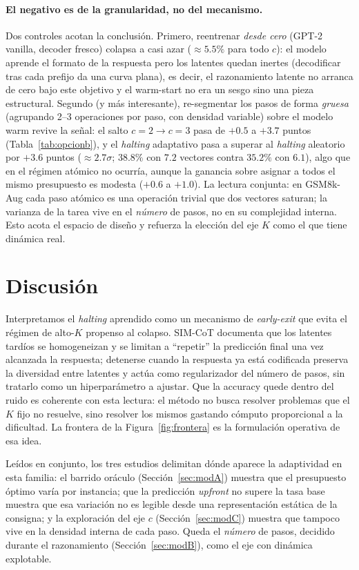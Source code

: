 \documentclass[11pt]{article}
\begin{document}
\paragraph{El negativo es de la granularidad, no del mecanismo.} Dos controles acotan la conclusión. Primero, reentrenar \emph{desde cero} (GPT-2 vanilla, decoder fresco) colapsa a casi azar ($\approx 5.5\%$ para todo $c$): el modelo aprende el formato de la respuesta pero los latentes quedan inertes (decodificar tras cada prefijo da una curva plana), es decir, el razonamiento latente no arranca de cero bajo este objetivo y el warm-start no era un sesgo sino una pieza estructural. Segundo (y más interesante), re-segmentar los pasos de forma \emph{gruesa} (agrupando 2--3 operaciones por paso, con densidad variable) sobre el modelo warm revive la señal: el salto $c{=}2 \rightarrow c{=}3$ pasa de $+0.5$ a $+3.7$ puntos (Tabla~\ref{tab:opcionb}), y el \textit{halting} adaptativo pasa a superar al \textit{halting} aleatorio por $+3.6$ puntos ($\approx 2.7\sigma$; $38.8\%$ con $7.2$ vectores contra $35.2\%$ con $6.1$), algo que en el régimen atómico no ocurría, aunque la ganancia sobre asignar a todos el mismo presupuesto es modesta ($+0.6$ a $+1.0$). La lectura conjunta: en GSM8k-Aug cada paso atómico es una operación trivial que dos vectores saturan; la varianza de la tarea vive en el \emph{número} de pasos, no en su complejidad interna. Esto acota el espacio de diseño y refuerza la elección del eje $K$ como el que tiene dinámica real.

\section{Discusión}

Interpretamos el \textit{halting} aprendido como un mecanismo de \emph{early-exit} que evita el régimen de alto-$K$ propenso al colapso. SIM-CoT \citep{wei2025simcot} documenta que los latentes tardíos se homogeneizan y se limitan a ``repetir'' la predicción final una vez alcanzada la respuesta; detenerse cuando la respuesta ya está codificada preserva la diversidad entre latentes y actúa como regularizador del número de pasos, sin tratarlo como un hiperparámetro a ajustar. Que la accuracy quede dentro del ruido es coherente con esta lectura: el método no busca resolver problemas que el $K$ fijo no resuelve, sino resolver los mismos gastando cómputo proporcional a la dificultad. La frontera de la Figura~\ref{fig:frontera} es la formulación operativa de esa idea.

Leídos en conjunto, los tres estudios delimitan dónde aparece la adaptividad en esta familia: el barrido oráculo (Sección~\ref{sec:modA}) muestra que el presupuesto óptimo varía por instancia; que la predicción \textit{upfront} no supere la tasa base muestra que esa variación no es legible desde una representación estática de la consigna; y la exploración del eje $c$ (Sección~\ref{sec:modC}) muestra que tampoco vive en la densidad interna de cada paso. Queda el \emph{número} de pasos, decidido durante el razonamiento (Sección~\ref{sec:modB}), como el eje con dinámica explotable.
\end{document}
